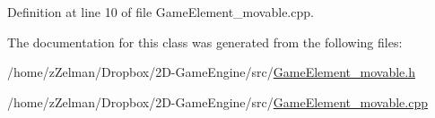 Definition at line 10 of file Game\-Element\-\_\-movable.\-cpp.



The documentation for this class was generated from the following files\-:\begin{DoxyCompactItemize}
\item 
/home/z\-Zelman/\-Dropbox/2\-D-\/\-Game\-Engine/src/\hyperlink{GameElement__movable_8h}{Game\-Element\-\_\-movable.\-h}\item 
/home/z\-Zelman/\-Dropbox/2\-D-\/\-Game\-Engine/src/\hyperlink{GameElement__movable_8cpp}{Game\-Element\-\_\-movable.\-cpp}\end{DoxyCompactItemize}
